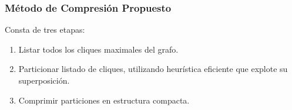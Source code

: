 \begin{frame}
\frametitle{Método de Compresión Propuesto}

Consta de tres etapas:

\begin{enumerate}
	\item Listar todos los cliques maximales del grafo.
	\item Particionar listado de cliques, utilizando heurística eficiente que explote su superposición.
	\item Comprimir particiones en estructura compacta.
\end{enumerate}

\end{frame}


%
%
%	
%	
%


